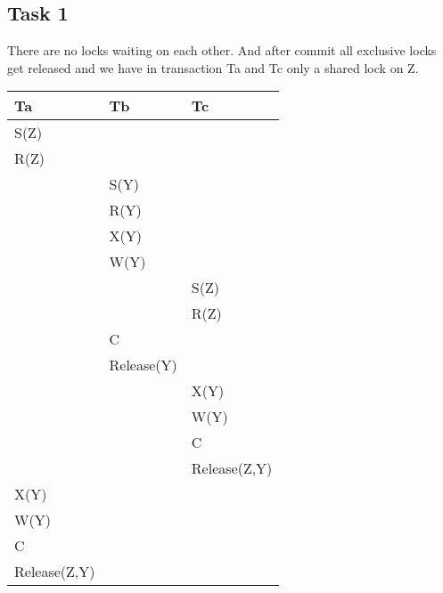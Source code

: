 \documentclass[12pt,a4paper]{article}
\begin{document}
\subsection{Task 1}
There are no locks waiting on each other. And after commit all exclusive locks get released and we have in transaction Ta and Tc only a shared lock on Z.
\begin{table}[!htbp]
    \centering
    \begin{tabularx}{\textwidth}{l|l|l}
        \hline
        Ta & Tb & Tc \\ 
        \hline
        S(Z) &  &  \\
        R(Z) &  &  \\
             & S(Y) & \\
             & R(Y) & \\
             & X(Y) & \\             
             & W(Y) & \\
             &  & S(Z)\\             
        	 &  & R(Z)\\
       		& C & \\        	 
       		& Release(Y) & \\
        	& & X(Y) \\       		
        	& & W(Y) \\
        	& & C \\ 
			& & Release(Z,Y) \\
		X(Y) & &  \\  
        W(Y) & &  \\   
        C & &  \\   
        Release(Z,Y) & &  \\ 
        \hline
    \end{tabularx}
\end{table}
\end{document}
